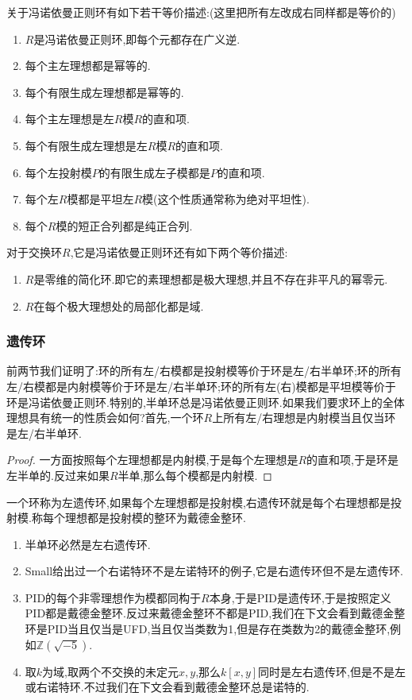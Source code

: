 关于冯诺依曼正则环有如下若干等价描述:(这里把所有左改成右同样都是等价的)
\begin{enumerate}
	\item $R$是冯诺依曼正则环,即每个元都存在广义逆.
	\item 每个主左理想都是幂等的.
	\item 每个有限生成左理想都是幂等的.
	\item 每个主左理想是左$R$模$R$的直和项.
	\item 每个有限生成左理想是左$R$模$R$的直和项.
	\item 每个左投射模$P$的有限生成左子模都是$P$的直和项.
	\item 每个左$R$模都是平坦左$R$模(这个性质通常称为绝对平坦性).
	\item 每个$R$模的短正合列都是纯正合列.
\end{enumerate}

对于交换环$R$,它是冯诺依曼正则环还有如下两个等价描述:
\begin{enumerate}
	\item $R$是零维的简化环.即它的素理想都是极大理想,并且不存在非平凡的幂零元.
	\item $R$在每个极大理想处的局部化都是域.
\end{enumerate}
\subsubsection{遗传环}

前两节我们证明了:环的所有左/右模都是投射模等价于环是左/右半单环;环的所有左/右模都是内射模等价于环是左/右半单环;环的所有左(右)模都是平坦模等价于环是冯诺依曼正则环.特别的,半单环总是冯诺依曼正则环.如果我们要求环上的全体理想具有统一的性质会如何?首先,一个环$R$上所有左/右理想是内射模当且仅当环是左/右半单环.
\begin{proof}
	
	一方面按照每个左理想都是内射模,于是每个左理想是$R$的直和项,于是环是左半单的.反过来如果$R$半单,那么每个模都是内射模.
\end{proof}

一个环称为左遗传环,如果每个左理想都是投射模,右遗传环就是每个右理想都是投射模.称每个理想都是投射模的整环为戴德金整环.
\begin{enumerate}
	\item 半单环必然是左右遗传环.
	\item Small给出过一个右诺特环不是左诺特环的例子,它是右遗传环但不是左遗传环.
	\item PID的每个非零理想作为模都同构于$R$本身,于是PID是遗传环,于是按照定义PID都是戴德金整环.反过来戴德金整环不都是PID,我们在下文会看到戴德金整环是PID当且仅当是UFD,当且仅当类数为1,但是存在类数为2的戴德金整环,例如$\mathbb{Z}(\sqrt{-5})$.
	\item 取$k$为域,取两个不交换的未定元$x,y$,那么$k[x,y]$同时是左右遗传环,但是不是左或右诺特环.不过我们在下文会看到戴德金整环总是诺特的.
\end{enumerate}

